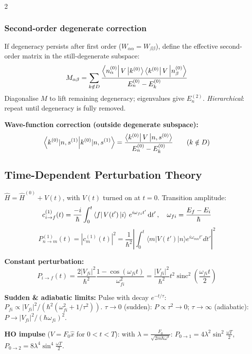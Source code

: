 \documentclass[9pt,a4paper]{article} %
\newcommand{\Hhat}{\hat{H}}
\newcommand{\xhat}{\hat{x}}
\begin{document}
\begin{multicols}{2}
\subsubsection{Second-order degenerate correction}
If degeneracy persists after first order ($W_{\alpha\alpha}=W_{\beta\beta}$), define the effective second-order matrix in the still-degenerate subspace:
\[
M_{\alpha\beta}=\sum_{k\notin D}\frac{\bra{n_\alpha^{(0)}}V\ket{k^{(0)}}\bra{k^{(0)}}V\ket{n_\beta^{(0)}}}{E_n^{(0)}-E_k^{(0)}}
\]
Diagonalise $M$ to lift remaining degeneracy; eigenvalues give $E_n^{(2)}$.  \emph{Hierarchical}: repeat until degeneracy is fully removed.

\textbf{Wave-function correction (outside degenerate subspace):}
\[
\braket{k^{(0)}|n,s^{(1)}}=\frac{\bra{k^{(0)}}V\ket{n,s^{(0)}}}{E_n^{(0)}-E_k^{(0)}} \qquad(k\notin D)
\]

\subsection{Time-Dependent Perturbation Theory}
$\Hhat=\Hhat^{(0)}+V(t)$, with $V(t)$ turned on at $t=0$. Transition amplitude:
\[
c_{i\rightarrow f}^{(1)}(t)=\frac{-i}{\hbar}\int_0^t \bra{f}V(t')\ket{i}\,e^{i\omega_{fi}t'}\dd{t'},\quad \omega_{fi}=\frac{E_f-E_i}{\hbar}
\]
\[P_{n \to m}^{(1)}(t) = |c_m^{(1)}(t)|^2 = \frac{1}{\hbar^2} \left| \int_{0}^{t} \langle m | V(t') | n \rangle e^{i \omega_{mn} t'} dt' \right|^2\]

\textbf{Constant perturbation:}
\[
P_{i\to f}(t) = \frac{2|V_{fi}|^2}{\hbar^2} \frac{1 - \cos(\omega_{fi} t)}{\omega_{fi}^2} = \frac{|V_{fi}|^2}{\hbar^2} t^2 \operatorname{sinc}^2\left(\frac{\omega_{fi} t}{2}\right)
\]

{\footnotesize
\textbf{Sudden \& adiabatic limits:}
Pulse with decay $e^{-t/\tau}$: $P_{fi}\propto |V_{fi}|^2/(\hbar^2(\omega_{fi}^2+1/\tau^2))$.
$\tau\to 0$ (sudden): $P\propto\tau^2\to 0$;\;
$\tau\to\infty$ (adiabatic): $P\to |V_{fi}|^2/(\hbar\omega_{fi})^2$.

\textbf{HO impulse} ($V=F_0\xhat$ for $0<t<T$): with $\lambda=\frac{F_0}{\sqrt{2m\hbar\omega^3}}$:
$P_{0\to 1}=4\lambda^2\sin^2\frac{\omega T}{2}$,\;
$P_{0\to 2}=8\lambda^4\sin^4\frac{\omega T}{2}$.
}

\end{multicols}
\end{document}
